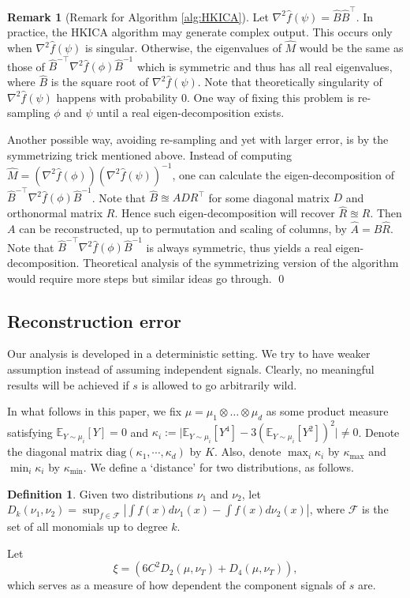 \documentclass[twoside]{article}
\newcommand{\E}{\mathbb{E}}
\theoremstyle{definition}
\newtheorem{definition}[lemma]{Definition}
\newtheorem{remark}[lemma]{Remark}
\begin{document}
\begin{remark}[Remark for Algorithm \ref{alg:HKICA}]
\label{rmk:symmetrization}
Let $\nabla^2\widehat{f}(\psi) =\widehat{B}\widehat{B}^{\top} $.
In practice, the HKICA algorithm may generate complex output. 
This occurs only when $\nabla^2\widehat{f}(\psi)$ is singular. 
Otherwise, the eigenvalues of $\widehat{M}$ would be the same as those of
$\widehat{B}^{-\top}\nabla^2 \widehat{f}(\phi)\widehat{B}^{-1}$ which is symmetric and thus has all real eigenvalues, where $\widehat{B} $ is the square root of $\nabla^2\widehat{f}(\psi)$. 
Note that theoretically singularity of $\nabla^2\widehat{f}(\psi)$ happens with probability 0. 
One way of fixing this problem is re-sampling $\phi$ and $\psi$ until a real eigen-decomposition exists.

Another possible way, avoiding re-sampling and yet with larger error, is by the symmetrizing trick mentioned above.
Instead of computing $\widehat{M} = (\nabla^2 \widehat{f}(\phi))(\nabla^2\widehat{f}(\psi))^{-1}$, one can calculate the eigen-decomposition of  $\widehat{B}^{-\top}\nabla^2 \widehat{f}(\phi)\widehat{B}^{-1}$. 
Note that $\widehat{B} \approxeq ADR^{\top}$ for some diagonal matrix $D$ and orthonormal matrix $R$. 
Hence such eigen-decomposition will recover $\widehat{R}\approxeq R$. 
Then $A$ can be reconstructed, up to permutation and scaling of columns, by $\widehat{A} = \widehat{B}\widehat{R}$.
Note that $ \widehat{B}^{-\top}\nabla^2 \widehat{f}(\phi)\widehat{B}^{-1}$ is always symmetric, thus yields a real eigen-decomposition. 
Theoretical analysis of the symmetrizing version of the algorithm would require more steps but similar ideas go through.
\qed
\end{remark}

\subsection{Reconstruction error}
\label{subsec:errorHK}
Our analysis is developed in a deterministic setting.
We try to have weaker assumption instead of assuming independent signals. 
Clearly, no meaningful results will be achieved if $s$ is allowed to go arbitrarily wild. 
 
In what follows in this paper, we fix $\mu = \mu_1\otimes \ldots \otimes \mu_d$ as some product measure
satisfying $\E_{Y\sim\mu_i}[Y]=0$ and $\kappa_i := \vert \E_{Y\sim \mu_i}[Y^4] - 3\left(\E_{Y\sim \mu_i}[Y^2]\right)^2 \vert \neq 0$.
Denote the diagonal matrix $\text{diag}(\kappa_1,\cdots,\kappa_d)$ by $K$. 
Also, denote $\max_{i} \kappa_i$ by $\kappa_{\max}$ and $\min_{i} \kappa_i$ by $\kappa_{\min}$.
We define a `distance' for two distributions, as follows. 
\begin{definition}
Given two distributions $\nu_1$ and $\nu_2$, let $D_k(\nu_1,\nu_2) = \sup_{f\in\mathcal{F}} |\int f(x)d\nu_1(x) - \int f(x)d\nu_2(x)|$, where $\mathcal{F}$ is the set of all monomials up to degree $k$.
\end{definition} 
Let 
\begin{equation}
\label{eq:xi}
\xi = \left( 6C^2D_2(\mu, \nu_T) + D_4(\mu, \nu_T)\right),
\end{equation}
which serves as a measure of how dependent the  component signals of $s$ are.
\end{document}
